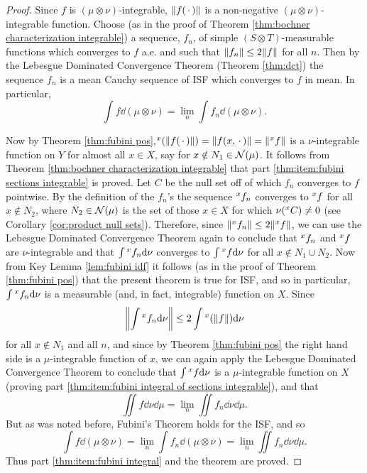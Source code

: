 \begin{proof}
Since $f$ is $(\mu\otimes\nu)$-integrable, $\norm{f(\imarg)}$ is a non-negative $(\mu\otimes\nu)$-integrable function. Choose (as in the proof of Theorem \ref{thm:bochner characterization integrable}) a sequence, $f_n$, of simple $(S\otimes T)$-measurable functions which converges to $f$ a.e. and such that $\norm{f_n}\leq 2\norm{f}$ for all $n$. Then by the Lebesgue Dominated Convergence Theorem (Theorem \ref{thm:dct}) the sequence $f_n$ is a mean Cauchy sequence of ISF which converges to $f$ in mean. In particular, $$\int f\dd(\mu\otimes\nu)=\lim_n\int f_n\dd(\mu\otimes\nu).$$

Now by Theorem \ref{thm:fubini pos},$\xsec{(\norm{f(\imarg)})}{x}=\norm{f(x,\imarg)}=\norm{\xsec{f}{x}}$ is a $\nu$-integrable function on $Y$ for almost all $x\in X$, say for $x\notin N_1\in\nring{\mu}$. It follows from Theorem \ref{thm:bochner characterization integrable} that part \ref{thm:item:fubini sections integrable} is proved. Let $C$ be the null set off of which $f_n$ converges to $f$ pointwise. By the definition of the $f_n$'s the sequence $\xsec{f_n}{x}$ converges to $\xsec{f}{x}$ for all $x\notin N_2$, where $N_2\in\nring{\mu}$ is the set of those $x\in X$ for which $\nu(\xsec{C}{x})\neq 0$ (see Corollary \ref{cor:product null sets}). Therefore, since $\norm{\xsec{f_n}{x}}\leq2\norm{\xsec{f}{x}}$, we can use the Lebesgue Dominated Convergence Theorem again to conclude that $\xsec{f_n}{x}$ and $\xsec{f}{x}$ are $\nu$-integrable and that $\int\xsec{f_n}{x}\dd\nu$ converges to $\int\xsec{f}{x}\dd\nu$ for all $x\notin N_1\cup N_2$. Now from Key Lemma \ref{lem:fubini idf} it follows (as in the proof of Theorem \ref{thm:fubini pos}) that the present theorem is true for ISF, and so in particular, $\int\xsec{f_n}{x}\dd\nu$ is a measurable (and, in fact, integrable) function on $X$. Since $$\norm{\int\xsec{f_n}{x}\dd\nu}\leq2\int\xsec{(\norm{f})}{x}\dd\nu$$ for all $x\notin N_1$ and all $n$, and since by Theorem \ref{thm:fubini pos} the right hand side is a $\mu$-integrable function of $x$, we can again apply the Lebesgue Dominated Convergence Theorem to conclude that $\int\xsec{f}{x}\dd\nu$ is a $\mu$-integrable function on $X$ (proving part \ref{thm:item:fubini integral of sections integrable}), and that $$\iint f\dd\nu\dd\mu=\lim_n\iint f_n\dd\nu\dd\mu.$$ But as was noted before, Fubini's Theorem holds for the ISF, and so $$\int f\dd(\mu\otimes\nu)=\lim_n\int f_n\dd(\mu\otimes\nu)=\lim_n\iint f_n\dd\nu\dd\mu.$$ Thus part \ref{thm:item:fubini integral} and the theorem are proved.
\end{proof}

